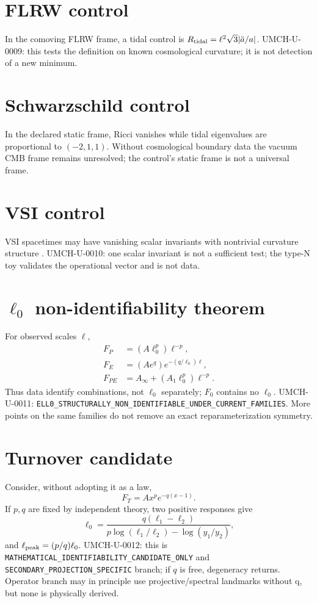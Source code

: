 \documentclass[11pt,a4paper]{article}
\begin{document}
\section{FLRW control}\label{sec:u-flrw}
In the comoving FLRW frame, a tidal control is $R_{\rm tidal}=\ell^2\sqrt3|\ddot a/a|$. UMCH-U-0009: this tests the definition on known cosmological curvature; it is not detection of a new minimum.

\section{Schwarzschild control}\label{sec:u-schwarzschild}
In the declared static frame, Ricci vanishes while tidal eigenvalues are proportional to $(-2,1,1)$. Without cosmological boundary data the vacuum CMB frame remains unresolved; the control's static frame is not a universal frame.

\section{VSI control}\label{sec:u-vsi}
VSI spacetimes may have vanishing scalar invariants with nontrivial curvature structure \cite{PelavasEtAl2005}. UMCH-U-0010: one scalar invariant is not a sufficient test; the type-N toy validates the operational vector and is not data.

\section{$\ell_0$ non-identifiability theorem}\label{sec:u-no-go}
For observed scales $\ell$,
\begin{align}\label{eq:u-degeneracy}
F_P&=(A\ell_0^p)\ell^{-p},\\
F_E&=(Ae^q)e^{-(q/\ell_0)\ell},\\
F_{PE}&=A_\infty+(A_1\ell_0^p)\ell^{-p}.
\end{align}
Thus data identify combinations, not $\ell_0$ separately; $F_0$ contains no $\ell_0$. UMCH-U-0011: \verb|ELL0_STRUCTURALLY_NON_IDENTIFIABLE_UNDER_CURRENT_FAMILIES|. More points on the same families do not remove an exact reparameterization symmetry.

\section{Turnover candidate}\label{sec:u-turnover}
Consider, without adopting it as a law,
\begin{equation}\label{eq:u-turnover}F_T=A x^p e^{-q(x-1)}.
\end{equation}
If $p,q$ are fixed by independent theory, two positive responses give
\begin{equation}\label{eq:u-inversion}\ell_0=\frac{q(\ell_1-\ell_2)}{p\log(\ell_1/\ell_2)-\log(y_1/y_2)},\end{equation}
and $\ell_{\rm peak}=(p/q)\ell_0$. UMCH-U-0012: this is \verb|MATHEMATICAL_IDENTIFIABILITY_CANDIDATE_ONLY| and \verb|SECONDARY_PROJECTION_SPECIFIC| branch; if $q$ is free, degeneracy returns. Operator branch may in principle use projective/spectral landmarks without q, but none is physically derived.
\end{document}
